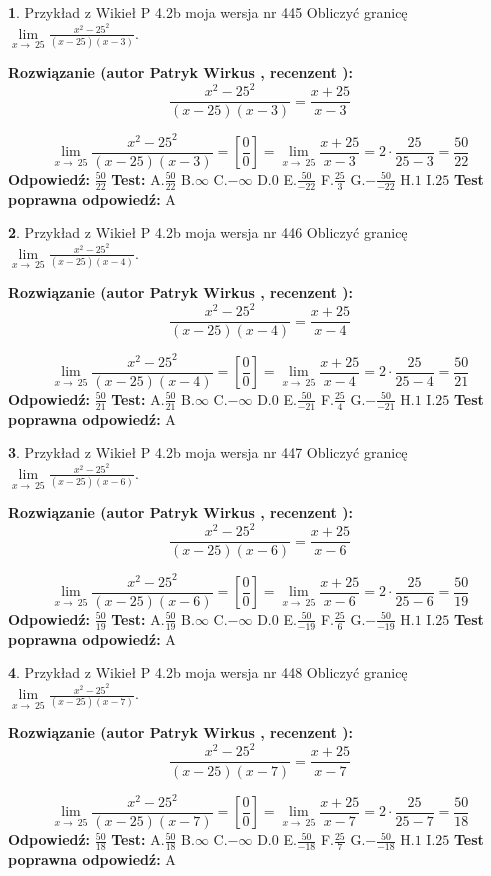 \documentclass[12pt, a4paper]{article}
\theoremstyle{definition} %
\newtheorem{zad}{}
\newcommand{\zadStart}[1]{\begin{zad}#1\newline}
\newcommand{\zadStop}{\end{zad}}
\newcommand{\rozwStart}[2]{\noindent \textbf{Rozwiązanie (autor #1 , recenzent #2): }\newline}
\newcommand{\rozwStop}{\newline}
\newcommand{\odpStart}{\noindent \textbf{Odpowiedź:}\newline}
\newcommand{\odpStop}{\newline}
\newcommand{\testStart}{\noindent \textbf{Test:}\newline}
\newcommand{\testStop}{\newline}
\newcommand{\kluczStart}{\noindent \textbf{Test poprawna odpowiedź:}\newline}
\newcommand{\kluczStop}{\newline}
\begin{document}
\zadStart{Przykład z Wikieł P 4.2b moja wersja nr 445}
Obliczyć granicę $\lim\limits_{x\to\ 25}\frac{x^{2}-25^{2}}{(x-25)(x-3)}$.
\zadStop
\rozwStart{Patryk Wirkus}{}
$$\frac{x^{2}-25^{2}}{(x-25)(x-3)}=\frac{x+25}{x-3}$$

$$\lim\limits_{x\to\ 25}\frac{x^{2}-25^{2}}{(x-25)(x-3)}=[\frac{0}{0}]=\lim\limits_{x\to\ 25}\frac{x+25}{x-3}=2 \cdot \frac{25}{25-3} = \frac{50}{22}$$
\rozwStop
\odpStart
$\frac{50}{22}$
\odpStop
\testStart
A.$\frac{50}{22}$
B.$\infty$
C.$-\infty$
D.$0$
E.$\frac{50}{-22}$
F.$\frac{25}{3}$
G.$-\frac{50}{-22}$
H.$1$
I.$25$
\testStop
\kluczStart
A
\kluczStop



\zadStart{Przykład z Wikieł P 4.2b moja wersja nr 446}
Obliczyć granicę $\lim\limits_{x\to\ 25}\frac{x^{2}-25^{2}}{(x-25)(x-4)}$.
\zadStop
\rozwStart{Patryk Wirkus}{}
$$\frac{x^{2}-25^{2}}{(x-25)(x-4)}=\frac{x+25}{x-4}$$

$$\lim\limits_{x\to\ 25}\frac{x^{2}-25^{2}}{(x-25)(x-4)}=[\frac{0}{0}]=\lim\limits_{x\to\ 25}\frac{x+25}{x-4}=2 \cdot \frac{25}{25-4} = \frac{50}{21}$$
\rozwStop
\odpStart
$\frac{50}{21}$
\odpStop
\testStart
A.$\frac{50}{21}$
B.$\infty$
C.$-\infty$
D.$0$
E.$\frac{50}{-21}$
F.$\frac{25}{4}$
G.$-\frac{50}{-21}$
H.$1$
I.$25$
\testStop
\kluczStart
A
\kluczStop



\zadStart{Przykład z Wikieł P 4.2b moja wersja nr 447}
Obliczyć granicę $\lim\limits_{x\to\ 25}\frac{x^{2}-25^{2}}{(x-25)(x-6)}$.
\zadStop
\rozwStart{Patryk Wirkus}{}
$$\frac{x^{2}-25^{2}}{(x-25)(x-6)}=\frac{x+25}{x-6}$$

$$\lim\limits_{x\to\ 25}\frac{x^{2}-25^{2}}{(x-25)(x-6)}=[\frac{0}{0}]=\lim\limits_{x\to\ 25}\frac{x+25}{x-6}=2 \cdot \frac{25}{25-6} = \frac{50}{19}$$
\rozwStop
\odpStart
$\frac{50}{19}$
\odpStop
\testStart
A.$\frac{50}{19}$
B.$\infty$
C.$-\infty$
D.$0$
E.$\frac{50}{-19}$
F.$\frac{25}{6}$
G.$-\frac{50}{-19}$
H.$1$
I.$25$
\testStop
\kluczStart
A
\kluczStop



\zadStart{Przykład z Wikieł P 4.2b moja wersja nr 448}
Obliczyć granicę $\lim\limits_{x\to\ 25}\frac{x^{2}-25^{2}}{(x-25)(x-7)}$.
\zadStop
\rozwStart{Patryk Wirkus}{}
$$\frac{x^{2}-25^{2}}{(x-25)(x-7)}=\frac{x+25}{x-7}$$

$$\lim\limits_{x\to\ 25}\frac{x^{2}-25^{2}}{(x-25)(x-7)}=[\frac{0}{0}]=\lim\limits_{x\to\ 25}\frac{x+25}{x-7}=2 \cdot \frac{25}{25-7} = \frac{50}{18}$$
\rozwStop
\odpStart
$\frac{50}{18}$
\odpStop
\testStart
A.$\frac{50}{18}$
B.$\infty$
C.$-\infty$
D.$0$
E.$\frac{50}{-18}$
F.$\frac{25}{7}$
G.$-\frac{50}{-18}$
H.$1$
I.$25$
\testStop
\kluczStart
A
\kluczStop
\end{document}
